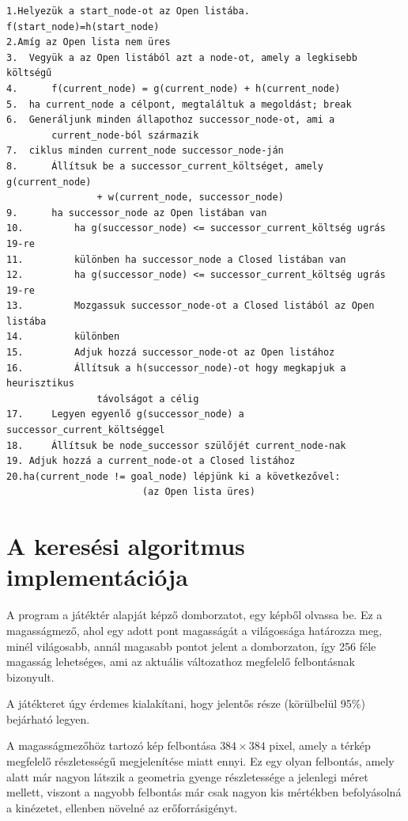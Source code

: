 

\begin{verbatim}
1.Helyezük a start_node-ot az Open listába. f(start_node)=h(start_node)
2.Amíg az Open lista nem üres
3.	Vegyük a az Open listából azt a node-ot, amely a legkisebb költségű
4.		f(current_node) = g(current_node) + h(current_node)
5.	ha current_node a célpont, megtaláltuk a megoldást; break
6.	Generáljunk minden állapothoz successor_node-ot, ami a 
		current_node-ból származik
7.	ciklus minden current_node successor_node-ján
8.		Állítsuk be a successor_current_költséget, amely g(current_node) 
				+ w(current_node, successor_node)
9.		ha successor_node az Open listában van
10.			ha g(successor_node) <= successor_current_költség ugrás 19-re
11.			különben ha successor_node a Closed listában van
12.			ha g(successor_node) <= successor_current_költség ugrás 19-re
13.			Mozgassuk successor_node-ot a Closed listából az Open listába
14.		    különben
15.			Adjuk hozzá successor_node-ot az Open listához
16.			Állítsuk a h(successor_node)-ot hogy megkapjuk a heurisztikus 
				távolságot a célig
17.		Legyen egyenlő g(successor_node) a successor_current_költséggel
18.		Állítsuk be node_successor szülőjét current_node-nak
19.	Adjuk hozzá a current_node-ot a Closed listához
20.ha(current_node != goal_node) lépjünk ki a következővel: 
						(az Open lista üres)
\end{verbatim}

\section{A keresési algoritmus implementációja}

A program a játéktér alapját képző domborzatot, egy képből olvassa be. Ez a magasságmező, ahol egy adott pont magasságát a világossága határozza meg, minél világosabb, annál magasabb pontot jelent a domborzaton, így 256 féle magasság lehetséges, ami az aktuális változathoz megfelelő felbontásnak bizonyult. 

A játékteret úgy érdemes kialakítani, hogy jelentős része (körülbelül 95\%) bejárható legyen.

A magasságmezőhöz tartozó kép felbontása $384 \times 384$ pixel, amely a térkép megfelelő részletességű megjelenítése miatt ennyi. Ez egy olyan felbontás, amely alatt már nagyon látszik a geometria gyenge részletessége a jelenlegi méret mellett, viszont a nagyobb felbontás már csak nagyon kis mértékben befolyásolná a kinézetet, ellenben növelné az erőforrásigényt. 

